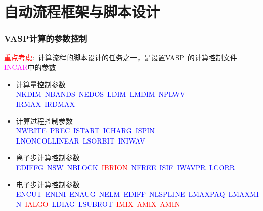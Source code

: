 \documentclass[cjk,slidestop,handout,compress,mathserif,blue]{beamer}	%
\begin{document}
\small
\section{自动流程框架与脚本设计}
%
\frame
{
	\frametitle{\textrm{VASP}计算的参数控制}
	\textcolor{red}{重点考虑}:~计算流程的脚本设计的任务之一，是设置\textrm{VASP~}的计算控制文件\textcolor{magenta}{\textrm{INCAR}}中的参数%
	\begin{itemize}
		\item 计算量控制参数\\
			\textcolor{blue}{NKDIM~NBANDS~NEDOS~LDIM~LMDIM~NPLWV\\IRMAX~IRDMAX}
		\item 计算过程控制参数\\
			\textcolor{blue}{NWRITE~PREC~ISTART~ICHARG~ISPIN\\LNONCOLLINEAR~LSORBIT~INIWAV}
		\item 离子步计算控制参数\\
			\textcolor{blue}{EDIFFG~NSW~NBLOCK~\textcolor{red}{IBRION}~NFREE~ISIF~IWAVPR~LCORR}
		\item 电子步计算控制参数\\
			\textcolor{blue}{ENCUT~ENINI~ENAUG~NELM~EDIFF~NLSPLINE~LMAXPAQ~LMAXMIN~\textcolor{red}{IALGO}~LDIAG~LSUBROT~\textcolor{red}{IMIX}~\textcolor{red}{AMIX}~\textcolor{red}{AMIN}}
	\end{itemize}
}
\end{document}
